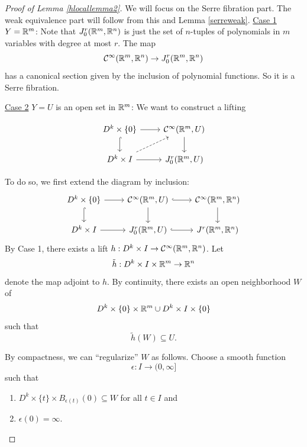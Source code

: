\documentclass{article}
\newtheorem{proposed work}[theorem]{Proposed Work}
\begin{document}
\begin{proof}[Proof of Lemma \ref{hlocallemma2}]
We will focus on the Serre fibration part. The weak equivalence part
will follow from this and Lemma \ref{serreweak}.
\newline
\noindent\underline{Case 1} $Y = \mathbb R^m$:
\newline
Note that $J^r_0(\mathbb R^m,\mathbb R^n)$ is just the set of $n$-tuples of
polynomials in $m$ variables with degree at most $r$. The map
\begin{equation*}
\mathcal C^\infty(\mathbb R^m,\mathbb R^n) \to  J_0^r(\mathbb R^m,\mathbb R^n)
\end{equation*}
has a canonical section given by the inclusion of polynomial
functions. So it is a Serre fibration.
\newline

\noindent\underline{Case 2} $Y = U$ is an open set in $\mathbb R^m$:
\newline
We want to construct a lifting

\begin{equation*}
\begin{tikzcd}
D^k\times \{0\} \ar[r] \ar[d, hook] & \cC^\infty(\R^m,U) \ar[d] \\
D^k\times I \ar[ur, dashed]\ar[r] & J^r_0(\R^m,U)
\end{tikzcd}
\end{equation*}

To do so, we first extend the diagram by inclusion:
\begin{equation*}
\begin{tikzcd}
D^k\times \{0\} \ar[r] \ar[d, hook] & \cC^\infty(\R^m,U) \ar[d] \ar[r, hook] &
\cC^\infty(\R^m, \R^n) \ar[d] \\
D^k\times I \ar[r] & J^r_0(\R^m,U) \ar[r, hook] & J^r(\R^m, \R^n)
\end{tikzcd}
\end{equation*}
By Case 1, there exists a lift $h: D^k\times I \to \mathcal C^\infty(\mathbb R^m,\mathbb R^n)$. Let
\begin{equation*}
\tilde{h}: D^k\times I\times \mathbb R^m \to \mathbb R^n
\end{equation*}
denote the map adjoint to $h$. By continuity, there exists an open
neighborhood $W$ of
\begin{equation*}
D^k\times\{0\}\times\mathbb R^m \cup D^k\times I \times\{0\}
\end{equation*}
such that
\begin{equation*}
\tilde{h}(W) \subseteq U.
\end{equation*}

By compactness, we can ``regularize'' $W$ as follows. Choose a smooth
function
\begin{equation*}
\epsilon: I \to (0,\infty]
\end{equation*}
such that
\begin{enumerate}
\item $D^k\times\{t\}\times B_{\epsilon(t)}(0) \subseteq W$ for all
$t \in I$ and
\item $\epsilon(0) = \infty$.
\end{enumerate}


\end{proof}
\end{document}
